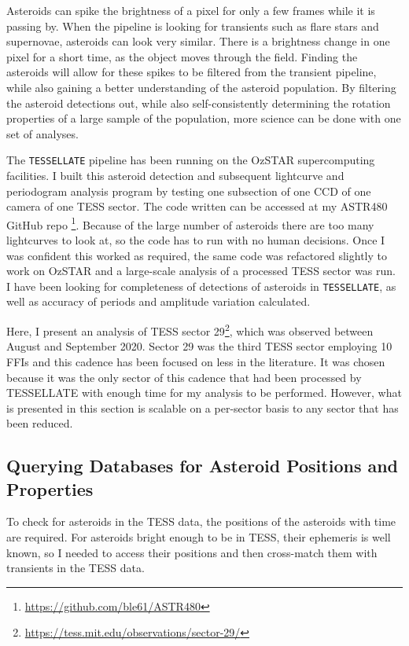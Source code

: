 \documentclass{UCreport}
\begin{document}
Asteroids can spike the brightness of a pixel for only a few frames while it is passing by.
When the pipeline is looking for transients such as flare stars and supernovae, asteroids can look very similar.
There is a brightness change in one pixel for a short time, as the object moves through the field.
Finding the asteroids will allow for these spikes to be filtered from the transient pipeline, while also gaining a better understanding of the asteroid population.
By filtering the asteroid detections out, while also self-consistently determining the rotation properties of a large sample of the population, more science can be done with one set of analyses.

The \texttt{TESSELLATE} pipeline has been running on the OzSTAR supercomputing facilities.
I built this asteroid detection and subsequent lightcurve and periodogram analysis program by testing one subsection of one CCD of one camera  of one TESS sector.
The code written can be accessed at my ASTR480 GitHub repo \footnote{\href{https://github.com/ble61/ASTR480}{https://github.com/ble61/ASTR480}}.
Because of the large number of asteroids there are too many lightcurves to look at, so the code has to run with no human decisions.
Once I was confident this worked as required, the same code was refactored slightly to work on OzSTAR and a large-scale analysis of a processed TESS sector was run.
I have been looking for completeness of detections of asteroids in \texttt{TESSELLATE}, as well as accuracy of periods and amplitude variation calculated.

Here, I present an analysis of TESS sector 29\footnote{\url{https://tess.mit.edu/observations/sector-29/}}, which was observed between  August and  September 2020.
Sector 29 was the third TESS sector employing \qty{10}{\min} FFIs and this cadence has been focused on less in the literature. 
It was chosen because it was the only sector of this cadence that had been processed by TESSELLATE with enough time for my analysis to be performed. However, what is presented in this section is scalable
on a per-sector basis to any sector that has been reduced. 


\subsection{Querying Databases for Asteroid Positions and Properties}\label{SubSec:Querry}

To check for asteroids in the TESS data, the positions of the asteroids with time are required.
For asteroids bright enough to be in TESS, their ephemeris is well known, so I needed to access their positions and then cross-match them with transients in the TESS data.
\end{document}

